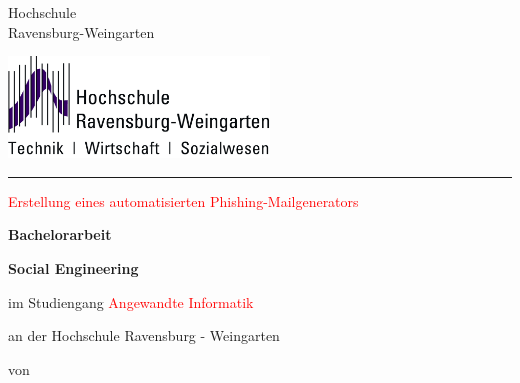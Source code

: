 
\thispagestyle{empty}
{
\normalsize{} \fontsize{12pt}{10}\selectfont 
\vspace{-1cm}
\begin{minipage}[b]{9.4cm}
{\fontsize{13pt}{13} \selectfont%
Hochschule\\[1ex]
Ravensburg-Weingarten}\\[1ex]
\end{minipage}
}
\begin{minipage}[b]{10cm}
\includegraphics*[height=2.7cm]{bilder/HSLogoWGd}
\end{minipage}


\vspace{10mm}
 
\hrule 
\vspace{1cm}
{
 \fontsize{20pt}{20}  \selectfont%
\begin{center}
\textcolor{red}{Erstellung eines automatisierten Phishing-Mailgenerators} %
\end{center}
}

\begin{center}
\large \textbf{Bachelorarbeit} %
\end{center}

\begin{center}
\textbf{Social Engineering} %
\end{center}

\vspace{5mm}

\begin{center}
im Studiengang \textcolor{red}{Angewandte Informatik} %
\end{center}

\begin{center}
an der Hochschule Ravensburg - Weingarten 
\end{center}
\begin{center}

\end{center}
\vspace{5mm}
\begin{center}
von
\end{center}





